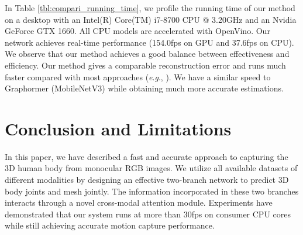 \documentclass{article}
\newcommand{\eg}{\textit{e}.\textit{g}.}
\begin{document}
\begin{table}[t]
\small

\renewcommand{\tabcolsep}{1.0pt}
\centering
{}
\vspace{-5pt}

\caption{Inference time of state-of-the-art methods and XFormer. The CPU speeds of our methods are tested with a single thread, while VNect and XNect use multiple CPU cores.}
\vspace{-10pt}
\label{tbl:compari_running_time}
\end{table}

In Table \ref{tbl:compari_running_time}, we profile the running time of our method on a desktop with an Intel(R) Core(TM) i7-8700 CPU @ 3.20GHz and an Nvidia GeForce GTX 1660. All CPU models are accelerated with OpenVino.
Our network achieves real-time performance (154.0fps 
on GPU and 37.6fps on CPU). We observe that our method achieves a good balance between effectiveness and efficiency. 
Our method gives a comparable reconstruction error and runs much faster compared with most approaches (\eg, \cite{kolotouros2019learning,kocabas2019vibe}). We have a similar speed to Graphormer (MobileNetV3) while obtaining much more accurate estimations.


\section{Conclusion and Limitations}
In this paper, we have described a fast and accurate approach to capturing the 3D human body from monocular RGB images. We utilize all available datasets of different modalities by designing an effective two-branch network to predict 3D body joints and mesh jointly. The information incorporated in these two branches interacts through a novel cross-modal attention module. Experiments have demonstrated that our system runs at more than 30fps on consumer CPU cores while still achieving accurate motion capture performance.
\end{document}
